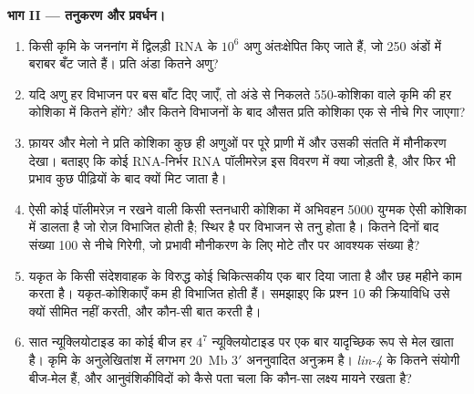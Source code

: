 \begin{problem}
\medskip
\noindent\textbf{भाग II --- तनुकरण और प्रवर्धन।}
\begin{enumerate}[resume]
  \item किसी कृमि के जननांग में द्विलड़ी RNA के $10^{6}$ अणु
        अंतःक्षेपित किए जाते हैं, जो \num{250} अंडों में बराबर बँट
        जाते हैं। प्रति अंडा कितने अणु?
  \item यदि अणु हर विभाजन पर बस बाँट दिए जाएँ, तो अंडे से निकलते
        \num{550}-कोशिका वाले कृमि की हर कोशिका में कितने होंगे? और
        कितने विभाजनों के बाद औसत प्रति कोशिका एक से नीचे गिर जाएगा?
  \item फ़ायर और मेलो ने प्रति कोशिका कुछ ही अणुओं पर पूरे प्राणी में
        और उसकी संतति में मौनीकरण देखा। बताइए कि कोई RNA-निर्भर RNA
        पॉलीमरेज़ इस विवरण में क्या जोड़ती है, और फिर भी प्रभाव कुछ
        पीढ़ियों के बाद क्यों मिट जाता है।
  \item ऐसी कोई पॉलीमरेज़ न रखने वाली किसी स्तनधारी कोशिका में 
        अभिवहन \num{5000} युग्मक ऐसी कोशिका में डालता है जो रोज़
        विभाजित होती है;  स्थिर है पर विभाजन से तनु होता है।
        कितने दिनों बाद संख्या \num{100} से नीचे गिरेगी, जो प्रभावी
        मौनीकरण के लिए मोटे तौर पर आवश्यक संख्या है?
  \item यकृत के किसी संदेशवाहक के विरुद्ध कोई चिकित्सकीय  एक बार
        दिया जाता है और छह महीने काम करता है। यकृत-कोशिकाएँ कम ही
        विभाजित होती हैं। समझाइए कि प्रश्न 10 की क्रियाविधि उसे क्यों
        सीमित नहीं करती, और कौन-सी बात करती है।
  \item सात न्यूक्लियोटाइड का कोई बीज हर $4^{7}$ न्यूक्लियोटाइड पर एक
        बार यादृच्छिक रूप से मेल खाता है। कृमि के अनुलेखितांश में
        लगभग \qty{20}{Mb} 3$'$ अननुवादित अनुक्रम है। \emph{lin-4} के
        कितने संयोगी बीज-मेल हैं, और आनुवंशिकीविदों को कैसे पता चला कि
        कौन-सा लक्ष्य मायने रखता है?
\end{enumerate}


\end{problem}
